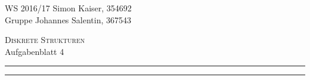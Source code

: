 \documentclass[a4paper,graphics,11pt]{article}
\begin{document}
\noindent WS 2016/17        							\hfill Simon Kaiser, 354692 \\
\noindent Gruppe                       \hfill Johannes Salentin, 367543 \\

\begin{center}
\Large \textsc{Diskrete Strukturen} \\   %
\large Aufgabenblatt 4                        %
\end{center}
\begin{center}
\rule[0.5ex]{\textwidth}{0.6pt}\vspace*{-\baselineskip}\vspace{3.2pt}
\rule[0.5ex]{\textwidth}{1.6pt}\\
\end{center}
\end{document}
